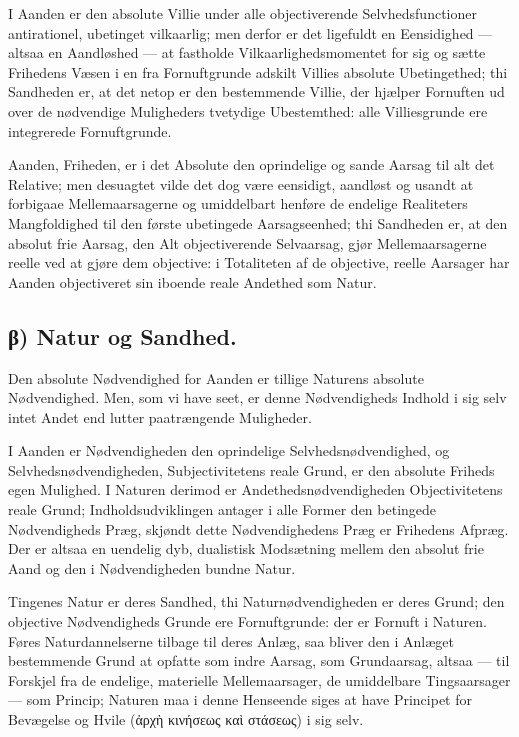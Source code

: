 \documentclass[12pt]{book}
\newcommand{\opage}[1]{\marginnote{\footnotesize\textit{[#1]}}}
\begin{document}
I Aanden er den absolute Villie under alle objectiverende
Selvhedsfunctioner antirationel, ubetinget vilkaarlig; men derfor er
det ligefuldt en Eensidighed --- altsaa en Aandløshed --- at
fastholde Vilkaarlighedsmomentet for sig og sætte Frihedens Væsen i
en fra Fornuftgrunde adskilt Villies absolute Ubetingethed; thi
Sandheden er, at det netop er den bestemmende Villie, der hjælper
Fornuften ud over de nødvendige Muligheders tvetydige Ubestemthed:
alle Villiesgrunde ere integrerede Fornuftgrunde.

Aanden, Friheden, er i det Absolute den oprindelige og sande Aarsag
til alt det Relative; men desuagtet vilde det dog være eensidigt,
aandløst og usandt at forbigaae Mellemaarsagerne og umiddelbart
henføre de endelige Realiteters Mangfoldighed til den første
ubetingede Aarsagseenhed; thi Sandheden er, at den absolut frie
Aarsag, den Alt objectiverende Selvaarsag, gjør Mellemaarsagerne
reelle ved at gjøre dem objective: i Totaliteten af de objective,
reelle Aarsager har Aanden objectiveret sin iboende reale Andethed
som Natur.

\subsection*{β) Natur og Sandhed.}
Den absolute Nødvendighed for Aanden er tillige Naturens absolute
Nødvendighed. Men, som vi have seet, er denne Nødvendigheds
\opage{83} Indhold i sig selv intet Andet end lutter paatrængende Muligheder.

I Aanden er Nødvendigheden den oprindelige Selvhedsnødvendighed, og
Selvhedsnødvendigheden, Subjectivitetens reale Grund, er den
absolute Friheds egen Mulighed. I Naturen derimod er
Andethedsnødvendigheden Objectivitetens reale Grund;
Indholdsudviklingen antager i alle Former den betingede
Nødvendigheds Præg, skjøndt dette Nødvendighedens Præg er Frihedens
Afpræg. Der er altsaa en uendelig dyb, dualistisk Modsætning mellem
den absolut frie Aand og den i Nødvendigheden bundne Natur.

Tingenes Natur er deres Sandhed, thi Naturnødvendigheden er deres
Grund; den objective Nødvendigheds Grunde ere Fornuftgrunde: der er
Fornuft i Naturen. Føres Naturdannelserne tilbage til deres Anlæg,
saa bliver den i Anlæget bestemmende Grund at opfatte som indre
Aarsag, som Grundaarsag, altsaa --- til Forskjel fra de endelige,
materielle Mellemaarsager, de umiddelbare Tingsaarsager --- som
Princip; Naturen maa i denne Henseende siges at have Principet for
Bevægelse og Hvile (ἀρχὴ κινήσεως καὶ στάσεως) i sig selv.
\end{document}
